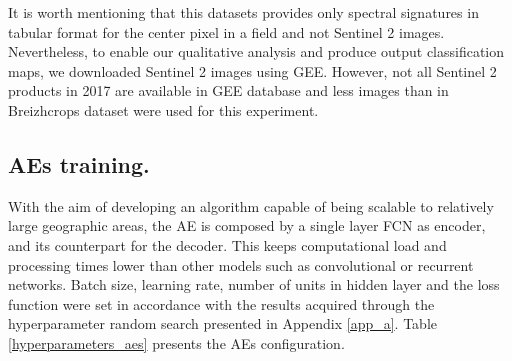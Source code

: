\documentclass[journal,article,submit,pdftex,moreauthors]{Definitions/mdpi}
\begin{document}
It is worth mentioning that this datasets provides only spectral signatures in tabular format for the center pixel in a field and not Sentinel 2 images. Nevertheless, to enable our qualitative analysis and produce output classification maps, we downloaded Sentinel 2 images using GEE. However, not all Sentinel 2 products in 2017 are available in GEE database and less images than in Breizhcrops dataset were used for this experiment.
\subsection{AEs training.}
With the aim of developing an algorithm capable of being scalable to relatively large geographic areas, the AE is composed by a single layer FCN as encoder, and its counterpart for the decoder.
This keeps computational load and processing times lower than other models such as convolutional or recurrent networks.
Batch size, learning rate, number of units in hidden layer and the loss function were set in accordance with the results acquired through the hyperparameter random search presented in Appendix \ref{app_a}.
Table \ref{hyperparameters_aes} presents the AEs configuration.
\end{document}
